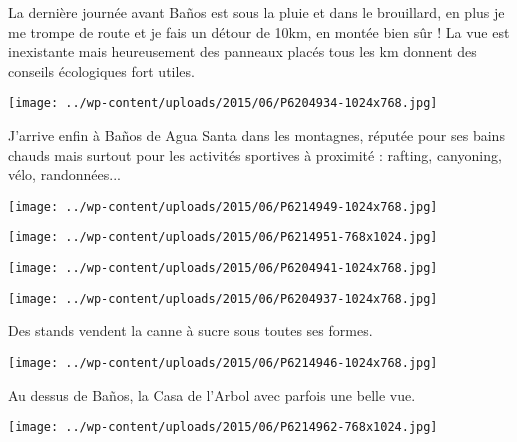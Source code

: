 La dernière journée avant Baños est sous la pluie et dans le brouillard, en plus je me trompe de route et je fais un détour de 10km, en montée bien sûr ! La vue est inexistante mais heureusement des panneaux placés tous les km donnent des conseils écologiques fort utiles. 
\begin{center} \texttt{[image: ../wp-content/uploads/2015/06/P6204934-1024x768.jpg]} \end{center}

J'arrive enfin à Baños de Agua Santa dans les montagnes, réputée pour ses bains chauds mais surtout pour les activités sportives à proximité : rafting, canyoning, vélo, randonnées... 
\begin{center} \texttt{[image: ../wp-content/uploads/2015/06/P6214949-1024x768.jpg]} \end{center}
\begin{center} \texttt{[image: ../wp-content/uploads/2015/06/P6214951-768x1024.jpg]} \end{center}
\begin{center} \texttt{[image: ../wp-content/uploads/2015/06/P6204941-1024x768.jpg]} \end{center}
\begin{center} \texttt{[image: ../wp-content/uploads/2015/06/P6204937-1024x768.jpg]} \end{center}

Des stands vendent la canne à sucre sous toutes ses formes. 
\begin{center} \texttt{[image: ../wp-content/uploads/2015/06/P6214946-1024x768.jpg]} \end{center}
\vspace{-\topsep}
\pagebreak

Au dessus de Baños, la Casa de l'Arbol avec parfois une belle vue. 
\begin{center} \texttt{[image: ../wp-content/uploads/2015/06/P6214962-768x1024.jpg]} \end{center}